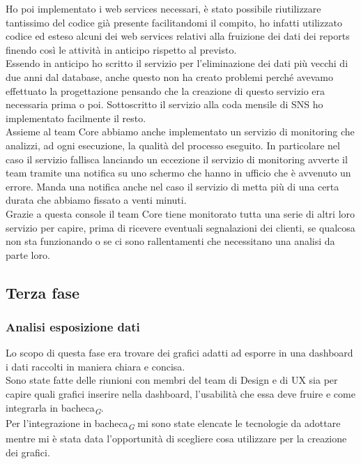 \documentclass[a4paper, 12pt, twoside, openright]{book}
\newcommand{\gloss}[1]{#1\textsubscript{\textit{\tiny{G}}}}
\begin{document}
Ho poi implementato i web services necessari, è stato possibile riutilizzare tantissimo del codice già presente facilitandomi il compito, ho infatti utilizzato codice ed esteso alcuni dei web services relativi alla fruizione dei dati dei reports finendo così le attività in anticipo rispetto al previsto.\\
Essendo in anticipo ho scritto il servizio per l'eliminazione dei dati più vecchi di due anni dal database, anche questo non ha creato problemi perché avevamo effettuato la progettazione pensando che la creazione di questo servizio era necessaria prima o poi. Sottoscritto il servizio alla coda mensile di SNS ho implementato facilmente il resto.\\

Assieme al team Core abbiamo anche implementato un servizio di monitoring che analizzi, ad ogni esecuzione, la qualità del processo eseguito. In particolare nel caso il servizio fallisca lanciando un eccezione il servizio di monitoring avverte il team tramite una notifica su uno schermo che hanno in ufficio che è avvenuto un errore. Manda una notifica anche nel caso il servizio di metta più di una certa durata che abbiamo fissato a venti minuti.\\
Grazie a questa console il team Core tiene monitorato tutta una serie di altri loro servizio per capire, prima di ricevere eventuali segnalazioni dei clienti, se qualcosa non sta funzionando o se ci sono rallentamenti che necessitano una analisi da parte loro.\\

\subsection{Terza fase}

\subsubsection{Analisi esposizione dati}
Lo scopo di questa fase era trovare dei grafici adatti ad esporre in una dashboard i dati raccolti in maniera chiara e concisa.\\
Sono state fatte delle riunioni con membri del team di Design e di UX sia per capire quali grafici inserire nella dashboard, l'usabilità che essa deve fruire e come integrarla in \gloss{bacheca}.\\
Per l'integrazione in \gloss{bacheca} mi sono state elencate le tecnologie da adottare mentre mi è stata data l'opportunità di scegliere cosa utilizzare per la creazione dei grafici.\\
\end{document}
